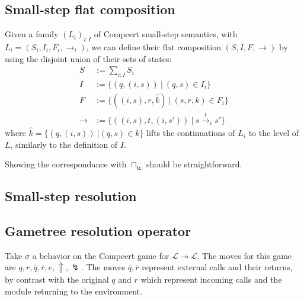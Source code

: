 \documentclass{article}
\newcommand{\kw}[1]{{\mathsf{#1}}}
\begin{document}
\subsection{Small-step flat composition}

Given a family $(L_i)_{i:I}$ of Compcert small-step semantics,
with $L_i = (S_i, I_i, F_i, {\rightarrow_i})$,
we can define their flat composition $(S, I, F, {\rightarrow})$
by using the disjoint union of their sets of states:
\begin{align*}
  S &:= \sum_{i:I} S_i \\
  I &:= \{ (q, (i, s)) \: \vert \: (q, s) \in I_i \} \\
  F &:= \{ ((i, s), r, \hat{k}) \: \vert \: (s, r, k) \in F_i \} \\
  {\rightarrow} &:= \{ ((i, s), t, (i, s')) \: \vert \: s
\stackrel{t}{\rightarrow}_i s' \}
\end{align*}
where $\hat{k} = \{ (q, (i, s)) \: \vert (q, s) \in k \}$
lifts the continuations of $L_i$ to the level of $L$,
similarly to the definition of $I$.

Showing the correspondance with $\sqcap_\kw{tc}$
should be straightforward.

\subsection{Small-step resolution}

%

\subsection{Gametree resolution operator}

Take $\sigma$ a behavior on the Compcert game for
$\mathcal{L} \multimap \mathcal{L}$.
The moves for this game are $q, r, \bar{q}, \bar{r}, e, \Uparrow, \lightning$.
The moves $\bar{q}, \bar{r}$ represent external calls and their returns,
by contrast with the original $q$ and $r$ which represent
incoming calls and the module returning to the environment.
\end{document}
